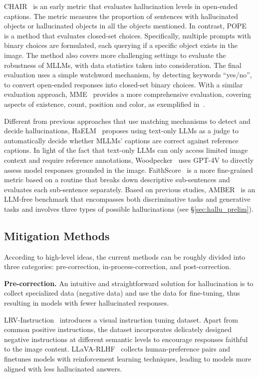 CHAIR~\cite{rohrbach2018object} is an early metric that evaluates hallucination levels in open-ended captions. The metric measures the proportion of sentences with hallucinated objects or hallucinated objects in all the objects mentioned.
In contrast, POPE~\cite{li2023evaluating} is a method that evaluates closed-set choices. Specifically, multiple prompts with binary choices are formulated, each querying if a specific object exists in the image. The method also covers more challenging settings to evaluate the robustness of MLLMs, with data statistics taken into consideration. The final evaluation uses a simple watchword mechanism, \ie by detecting keywords ``yes/no'', to convert open-ended responses into closed-set binary choices.
With a similar evaluation approach, MME~\cite{mme} provides a more comprehensive evaluation, covering aspects of existence, count, position and color, as exemplified in~\cite{yin2023woodpecker}.

Different from previous approaches that use matching mechanisms to detect and decide hallucinations, HaELM~\cite{wang2023evaluation} proposes using text-only LLMs as a judge to automatically decide whether MLLMs' captions are correct against reference captions. In light of the fact that text-only LLMs can only access limited image context and require reference annotations, Woodpecker~\cite{yin2023woodpecker} uses GPT-4V to directly assess model responses grounded in the image.
FaithScore~\cite{jing2023faithscore} is a more fine-grained metric based on a routine that breaks down descriptive sub-sentences and evaluates each sub-sentence separately.
Based on previous studies, AMBER~\cite{wang2023llm} is an LLM-free benchmark that encompasses both discriminative tasks and generative tasks and involves three types of possible hallucinations (see \S \ref{sec:hallu_prelim}).

\subsection{Mitigation Methods}
\label{sec:hallu_method}
According to high-level ideas, the current methods can be roughly divided into three categories: pre-correction, in-process-correction, and post-correction.

\noindent \textbf{Pre-correction.}
An intuitive and straightforward solution for hallucination is to collect specialized data (\eg negative data) and use the data for fine-tuning, thus resulting in models with fewer hallucinated responses. 

LRV-Instruction~\cite{liu2024mitigating} introduces a visual instruction tuning dataset. Apart from common positive instructions, the dataset incorporates delicately designed negative instructions at different semantic levels to encourage responses faithful to the image content.
LLaVA-RLHF~\cite{sun2023aligning} collects human-preference pairs and finetunes models with reinforcement learning techniques, leading to models more aligned with less hallucinated answers.

